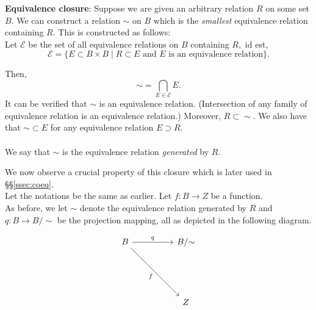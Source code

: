 \textbf{Equivalence closure}: Suppose we are given an arbitrary relation $R$ on some set $B.$ We can construct a relation ${\sim}$ on $B$ which is the \emph{smallest} equivalence relation containing $R$. This is constructed as follows:\\
Let $\mathcal{E}$ be the set of all equivalence relations on $B$ containing $R,$ id est,
\begin{equation*} 
	\mathcal{E} = \{E \subset B \times B \mid R \subset E \text{ and } E \text{ is an equivalence relation}\}.
\end{equation*}

Then, 
\begin{equation*} 
	{\sim} = \bigcap_{E \in \mathcal{E}}E.
\end{equation*}
It can be verified that ${\sim}$ is an equivalence relation. (Intersection of any family of equivalence relation is an equivalence relation.) Moreover, $R \subset {\sim}.$ We also have that ${\sim} \subset E$ for any equivalence relation $E \supset R.$\\~\\
We say that ${\sim}$ is the equivalence relation \emph{generated} by $R.$

We now observe a crucial property of this closure which is later used in \S\S\ref{ssec:coeq}.\\
Let the notations be the same as earlier. Let $f:B\to Z$ be a function.\\
As before, we let ${\sim}$ denote the equivalence relation generated by $R$ and $q:B \to B/{\sim}$ be the projection mapping, all as depicted in the following diagram.

\begin{equation*} 
	\begin{tikzcd}
		B \arrow[rr, "q"] \arrow[rrddd, "f"'] && B/{\sim}\\
		&&\\&&\\
		&& Z
	\end{tikzcd}
\end{equation*}

